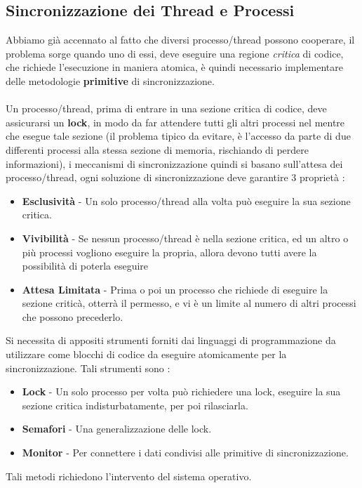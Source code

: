\documentclass[12pt, letterpaper]{article}
\newcommand{\acc}{\\\hphantom{}\\}
\begin{document}
\subsection{Sincronizzazione dei Thread e Processi}
Abbiamo già accennato al fatto che diversi processo/thread possono cooperare, il problema sorge quando uno di essi, deve 
eseguire una regione \textit{critica} di codice, che richiede l'esecuzione in maniera atomica, è quindi necessario 
implementare delle metodologie \textbf{primitive} di sincronizzazione.\acc 
Un processo/thread, prima di entrare in una sezione critica di codice, deve assicurarsi un 
\textbf{lock}, in modo da far attendere tutti gli altri processi nel mentre che esegue tale sezione (il problema tipico da 
evitare, è l'accesso da parte di due differenti processi alla stessa sezione di memoria, rischiando di perdere informazioni), 
i meccanismi di sincronizzazione quindi si basano sull'attesa dei processo/thread, ogni soluzione di 
sincronizzazione deve garantire 3 proprietà : \begin{itemize}
    \item \textbf{Esclusività} - Un solo processo/thread alla volta può eseguire la sua sezione critica.
    \item \textbf{Vivibilità} - Se nessun processo/thread è nella sezione critica, ed un altro o più processi vogliono eseguire la propria, 
    allora devono tutti avere la possibilità di poterla eseguire 
    \item \textbf{Attesa Limitata} - Prima o poi un processo che richiede di eseguire la sezione criticà, otterrà il permesso, 
     e vi è un limite al numero di altri processi che possono precederlo.
\end{itemize}
Si necessita di appositi strumenti forniti dai linguaggi di programmazione da utilizzare come 
blocchi di codice da eseguire atomicamente per la sincronizzazione. Tali strumenti sono : \begin{itemize}
    \item \textbf{Lock} - Un solo processo per volta può richiedere una lock, eseguire la sua sezione critica 
    indisturbatamente, per poi rilasciarla. 
    \item \textbf{Semafori} - Una generalizzazione delle lock. 
    \item \textbf{Monitor} - Per connettere i dati condivisi alle primitive di sincronizzazione.
\end{itemize}
Tali metodi richiedono l'intervento del sistema operativo. 
\end{document}

